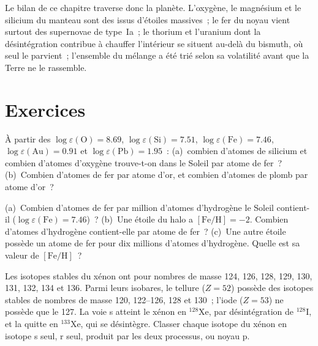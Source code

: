 Le bilan de ce chapitre traverse donc la planète. L'oxygène,
le magnésium et le silicium du manteau sont des  issus d'étoiles
massives~; le fer du noyau vient surtout des supernovae de type~Ia~; le thorium et l'uranium
dont la désintégration contribue à chauffer l'intérieur se situent au-delà du bismuth,
où seul le  parvient~; l'ensemble du mélange a été trié selon sa
volatilité avant que la Terre ne le rassemble.

\section{Exercices}

\begin{exercise}[$\star$]\label{exo:b3:origin-of-elements:1}
À partir des  $\log\varepsilon(\mathrm{O}) = 8.69$,
$\log\varepsilon(\mathrm{Si}) = 7.51$, $\log\varepsilon(\mathrm{Fe}) =
7.46$, $\log\varepsilon(\mathrm{Au}) = 0.91$ et
$\log\varepsilon(\mathrm{Pb}) = 1.95$~: (a)~combien d'atomes de silicium et
combien d'atomes d'oxygène trouve-t-on dans le Soleil par atome de fer~? (b)~Combien d'atomes de fer
par atome d'or, et combien d'atomes de plomb par atome d'or~?
\end{exercise}

\begin{exercise}[$\star$]\label{exo:b3:origin-of-elements:2}
(a)~Combien d'atomes de fer par million d'atomes d'hydrogène le Soleil
contient-il ($\log\varepsilon(\mathrm{Fe}) = 7.46$)~? (b)~Une étoile du halo a
$[\mathrm{Fe/H}] = -2$. Combien d'atomes d'hydrogène contient-elle par atome
de fer~? (c)~Une autre étoile possède un atome de fer pour dix millions d'atomes
d'hydrogène. Quelle est sa valeur de $[\mathrm{Fe/H}]$~?
\end{exercise}

\begin{exercise}[$\star$]\label{exo:b3:origin-of-elements:3}
Les isotopes stables du xénon ont pour nombres de masse 124, 126, 128, 129, 130,
131, 132, 134 et 136. Parmi leurs isobares, le tellure ($Z = 52$) possède des
isotopes stables de nombres de masse 120, 122--126, 128 et 130~; l'iode ($Z = 53$) ne possède que le 127.
La voie s atteint le xénon en $^{128}\mathrm{Xe}$, par désintégration de
$^{128}\mathrm{I}$, et la quitte en $^{133}\mathrm{Xe}$, qui se désintègre.
Classer chaque isotope du xénon en isotope s seul, r seul, produit par les deux
processus, ou noyau p.
\end{exercise}

